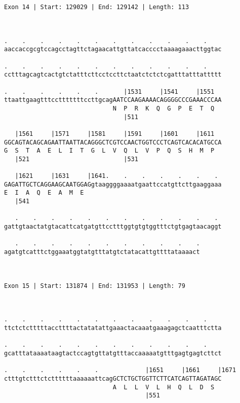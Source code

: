 \documentclass{article}
\begin{document}
\begin{Verbatim}
Exon 14 | Start: 129029 | End: 129142 | Length: 113



.    .    .    .    .    .    .    .    .    .    .    .    
aaccaccgcgtccagcctagttctagaacattgttatcacccctaaaagaaacttggtac
                                                            
.    .    .    .    .    .    .    .    .    .    .    .    
cctttagcagtcactgtctatttcttcctccttctaatctctctcgatttatttattttt
                                                            
.    .    .    .    .    .       |1531     |1541     |1551  
ttaattgaagtttcctttttttccttgcagAATCCAAGAAAACAGGGGCCCGAAACCCAA
                              N  P  R  K  Q  G  P  E  T  Q  
                                 |511                       
  
   |1561     |1571     |1581     |1591     |1601     |1611  
GGCAGTACAGCAGAATTAATTACAGGGCTCGTCCAACTGGTCCCTCAGTCACACATGCCA
G  S  T  A  E  L  I  T  G  L  V  Q  L  V  P  Q  S  H  M  P  
   |521                          |531                       
  
   |1621     |1631     |1641.    .    .    .    .    .    . 
GAGATTGCTCAGGAAGCAATGGAGgtaaggggaaaatgaattccatgttcttgaaggaaa
E  I  A  Q  E  A  M  E                                      
   |541                                                     
  
   .    .    .    .    .    .    .    .    .    .    .    . 
gattgtaactatgtacattcatgatgttcctttggtgtgtggtttctgtgagtaacaggt
                                                            
   .    .    .    .    .    .    .    .    .    .    .
agatgtcatttctggaaatggtatgtttatgtctatacattgttttataaaact
                                                      
                                                      
 
Exon 15 | Start: 131874 | End: 131953 | Length: 79



.    .    .    .    .    .    .    .    .    .    .    .    
ttctctctttttaccttttactatatattgaaactacaaatgaaagagctcaatttctta
                                                            
.    .    .    .    .    .    .    .    .    .    .    .    
gcatttataaaataagtactccagtgttatgtttaccaaaaatgtttgagtgagtcttct
                                                            
.    .    .    .    .    .             |1651     |1661     |1671
ctttgtctttctcttttttaaaaaattcagGCTCTGCTGGTTCTTCATCAGTTAGATAGC
                              A  L  L  V  L  H  Q  L  D  S  
                                       |551                 
  

\end{Verbatim}
\end{document}
